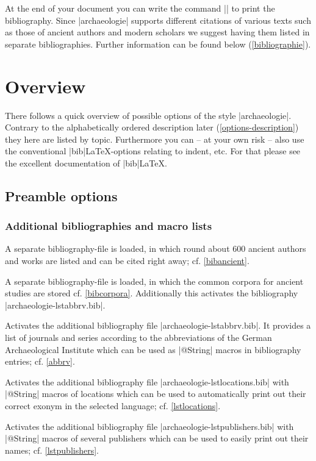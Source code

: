\documentclass[a4paper,
10pt,
greek,
french,
spanish,
italian,
ngerman,
english
]{ltxdoc}
\begin{document}
At the end of your document you can write the command |\printbibliography| to print 
the bibliography. 
Since |archaeologie| supports different citations of various texts such as those of ancient authors and  modern scholars we suggest  having them listed in separate bibliographies. 
Further information can be found below   (\cref{bibliographie}).

\section{Overview}\label{overview}
There follows a quick overview of possible options of the style |archaeologie|. 
Contrary to the alphabetically ordered description later (\cref{options-description}) they here are listed by topic.
Furthermore you can -- at your own risk -- also use the conventional |bib|\LaTeX-options relating to indent, etc. 
For that please see the excellent documentation of  |bib|\LaTeX.

\subsection{Preamble options}\label{preamble_options}
\subsubsection{Additional bibliographies and macro lists}
A separate bibliography-file is loaded, in which round about 
600 ancient authors and works are listed and can be cited right away; cf. \cref{bibancient}.

A separate bibliography-file is loaded, in which the common corpora for ancient studies are stored cf. \cref{bibcorpora}.
Additionally this activates the bibliography |archaeologie-lstabbrv.bib|.

Activates the additional bibliography file |archaeologie-lstabbrv.bib|.
It provides a list of journals and series according to the abbreviations of the 
German Archaeological Institute which can be used as |@String| macros in bibliography entries; cf. \cref{abbrv}. 

Activates the additional bibliography file |archaeologie-lstlocations.bib|
with |@String| macros of locations which can be used to automatically print out their correct exonym in the selected language; cf. \cref{lstlocations}.

Activates the additional bibliography file |archaeologie-lstpublishers.bib| with |@String| macros 
of several publishers which can be used to easily print out their names; cf. \cref{lstpublishers}.
\end{document}
